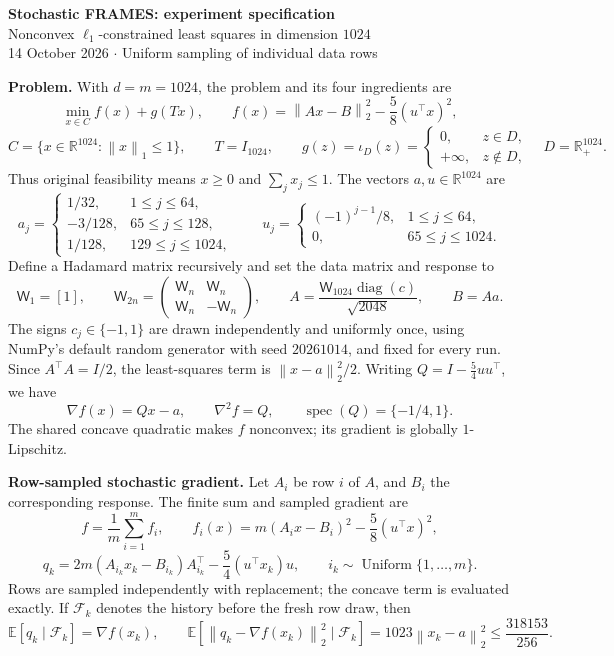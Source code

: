 \documentclass[10pt,a4paper]{article}
\newcommand{\R}{\mathbb R}
\newcommand{\E}{\mathbb E}
\newcommand{\norm}[1]{\left\|#1\right\|}
\begin{document}
\begin{center}
{\Large\bfseries Stochastic FRAMES: experiment specification}\\[3pt]
{\large Nonconvex $\ell_1$-constrained least squares in dimension $1024$}\\[2pt]
14 October 2026 \quad $\cdot$ \quad Uniform sampling of individual data rows
\end{center}

\textbf{Problem.} With $d=m=1024$, the problem and its four ingredients are
\[
\boxed{\min_{x\in C} f(x)+g(Tx),\qquad
 f(x)=\norm{Ax-B}_2^2-\frac58(u^\top x)^2,}
\]
\[
C=\{x\in\R^{1024}:\norm{x}_1\le1\},\qquad T=I_{1024},\qquad
g(z)=\iota_D(z)=\begin{cases}0,&z\in D,\\+\infty,&z\notin D,\end{cases}
\quad D=\R_+^{1024}.
\]
Thus original feasibility means $x\ge0$ and $\sum_jx_j\le1$.
The vectors $a,u\in\R^{1024}$ are
\[
a_j=\begin{cases}
1/32,&1\le j\le64,\\
-3/128,&65\le j\le128,\\
1/128,&129\le j\le1024,
\end{cases}
\qquad
u_j=\begin{cases}
(-1)^{j-1}/8,&1\le j\le64,\\
0,&65\le j\le1024.
\end{cases}
\]
Define a Hadamard matrix recursively and set the data matrix and response to
\[
\mathsf W_1=[1],\qquad
\mathsf W_{2n}=\begin{pmatrix}\mathsf W_n&\mathsf W_n\\
\mathsf W_n&-\mathsf W_n\end{pmatrix},\qquad
\boxed{A=\frac{\mathsf W_{1024}\operatorname{diag}(c)}{\sqrt{2048}},\qquad B=Aa.}
\]
The signs $c_j\in\{-1,1\}$ are drawn independently and uniformly once, using
NumPy's default random generator with seed $20261014$, and fixed for every run.
Since $A^\top A=I/2$, the least-squares term is $\norm{x-a}_2^2/2$.
Writing $Q=I-\frac54uu^\top$, we have
\[
\nabla f(x)=Qx-a,\qquad
\nabla^2 f=Q,\qquad
\operatorname{spec}(Q)=\{-1/4,1\}.
\]
The shared concave quadratic makes $f$ nonconvex; its gradient is globally
$1$-Lipschitz.

\textbf{Row-sampled stochastic gradient.} Let $A_i$ be row $i$ of $A$, and $B_i$
the corresponding response. The finite sum and sampled gradient are
\[
f=\frac1m\sum_{i=1}^m f_i,\qquad
f_i(x)=m(A_ix-B_i)^2-\frac58(u^\top x)^2,
\]
\[
\boxed{q_k=2m(A_{i_k}x_k-B_{i_k})A_{i_k}^\top
       -\frac54(u^\top x_k)u,\qquad
 i_k\sim\operatorname{Uniform}\{1,\ldots,m\}.}
\]
Rows are sampled independently with replacement; the concave term is evaluated
exactly. If $\mathcal F_k$ denotes the history before the fresh row draw, then
\[
\E[q_k\mid\mathcal F_k]=\nabla f(x_k),\qquad
\E[\norm{q_k-\nabla f(x_k)}_2^2\mid\mathcal F_k]
=1023\norm{x_k-a}_2^2\le\frac{318153}{256}.
\]
\end{document}

